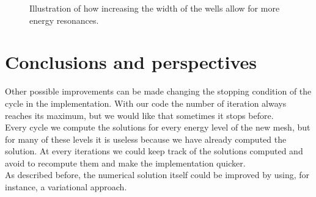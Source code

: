 \documentclass[12pt,a4paper,onecolumn]{article}
\theoremstyle{definition}
\theoremstyle{plain}
\begin{document}
\begin{figure}[H]
\centering
	\caption{Illustration of how increasing the width of the wells allow for more energy resonances.} 
	\label{fig:peak_increase}
\end{figure}














\section{Conclusions and perspectives}

Other possible improvements can be made changing the stopping condition of the cycle in the implementation. With our code the number of iteration always reaches its maximum, but we would like that sometimes it stops before.\\
Every cycle we compute the solutions for every energy level of the new mesh, but for many of these levels it is useless because we have already computed the solution. At every iterations we could  keep track of the solutions computed and avoid to recompute them and make the implementation quicker.\\
As described before, the numerical solution itself could be improved by using, for instance, a variational approach.
\end{document}
